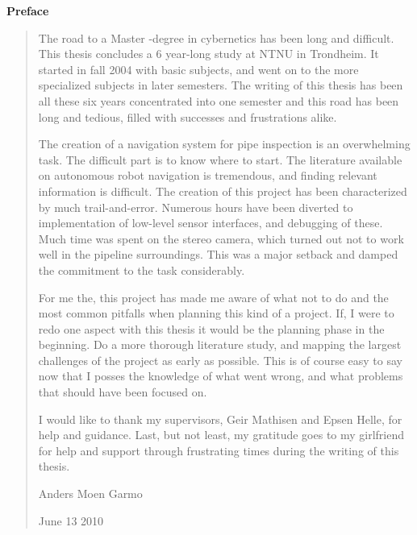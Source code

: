 \documentclass[twoside, a4paper, 12pt]{book}
\numberwithin{algorithm}{chapter}
\newenvironment{preface}
{\pagestyle{empty}
\begin{center}
\vspace*{1.5cm}
{\Large \bfseries Preface}
\end{center}
\vspace{0.5cm}
\begin{quote}}
{\end{quote}}
\begin{document}
\begin{preface}
The road to a Master -degree in cybernetics has been long and difficult. This thesis
concludes a 6 year-long study at NTNU in Trondheim. It started in fall 2004 with basic
subjects, and went on to the more specialized subjects in later semesters. The writing of
this thesis has been all these six years concentrated into one semester and this road has
been long and tedious, filled with successes and frustrations alike. 

The creation of a navigation system for pipe inspection is an overwhelming task. The
difficult part is to know where to start. The literature available on autonomous robot
navigation is tremendous, and finding relevant information is difficult. The creation of
this project has been characterized by much trail-and-error. Numerous hours have been
diverted to implementation of low-level sensor interfaces, and debugging of these. Much
time was spent on the stereo camera, which turned out not to work well in the pipeline
surroundings. This was a major setback and damped the commitment to the task considerably.

For me the, this project has made me aware of what not to do and the most common pitfalls
when planning this kind of a project. If, I were to redo one aspect with this thesis it
would be the planning phase in the beginning. Do a more thorough literature study, and
mapping the largest challenges of the project as early as possible. This is of course easy
to say now that I posses the knowledge of what went wrong, and what problems that should
have been focused on. 

I would like to thank my supervisors, Geir Mathisen and Epsen Helle, for help and
guidance. Last, but not least, my gratitude goes to my girlfriend for help and support
through frustrating times during the writing of this thesis.

\hfill

Anders Moen Garmo

June 13 2010

\end{preface}




\setcounter{secnumdepth}{3} %
\setcounter{tocdepth}{3}    %
\tableofcontents            %
\end{document}
